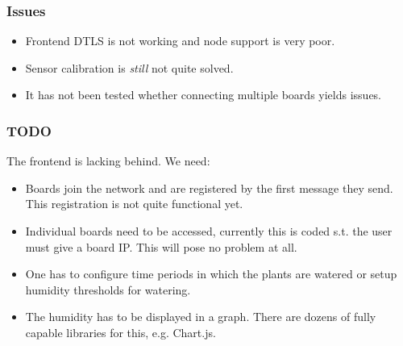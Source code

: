 \documentclass[10pt, xcolor=svgnames]{beamer}
\begin{document}
\begin{frame}
    \frametitle{Issues}

    \begin{itemize}
        \item Frontend DTLS is not working and node support is very poor.
        \item Sensor calibration is \emph{still} not quite solved.
        \item It has not been tested whether connecting multiple boards yields issues.
    \end{itemize}
\end{frame}

\begin{frame}
    \frametitle{TODO}

    The frontend is lacking behind. We need:

    \begin{itemize}
        \item Boards join the network and are registered by the first message they send. This registration is not quite functional yet.
        \item Individual boards need to be accessed, currently this is coded s.t. the user must give a board IP. This will pose no problem at all.
        \item One has to configure time periods in which the plants are watered or setup humidity thresholds for watering.
        \item The humidity has to be displayed in a graph. There are dozens of fully capable libraries for this, e.g. Chart.js.
    \end{itemize}
\end{frame}
\end{document}
